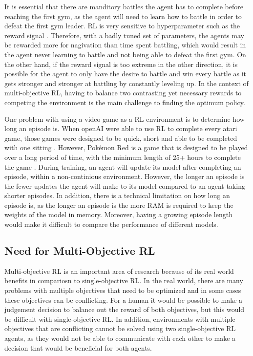 It is essential that there are manditory battles the agent has to complete before reaching the first gym, as the agent will need to learn how to battle in order to defeat the first gym leader. RL is very sensitive to hyperparameter such as the reward signal \cite{XanderSteenbrugge2019ppo}. Therefore, with a badly tuned set of parameters, the agents may be rewarded more for nagivation than time spent battling, which would result in the agent never learning to battle and not being able to defeat the first gym. On the other hand, if the reward signal is too extreme in the other direction, it is possible for the agent to only have the desire to battle and win every battle as it gets stronger and stronger at battling by constantly leveling up. In the context of multi-objective RL, having to balance two contrasting yet necessary rewards to competing the environment is the main challenge to finding the optimum policy. 

One problem with using a video game as a RL environment is to determine how long an episode is. When openAI were able to use RL to complete every atari game, those games were designed to be quick, short and able to be completed with one sitting \cite{brockman2016openai}. However, Pokémon Red is a game that is designed to be played over a long period of time, with the minimum length of 25+ hours to complete the game \cite{howlongtobeat}. During training, an agent will update its model after completing an episode, within a non-continious environment. However, the longer an episode is the fewer updates the agent will make to its model compared to an agent taking shorter episodes. In addition, there is a technical limitation on how long an episode is, as the longer an episode is the more RAM is required to keep the weights of the model in memory. Moreover, having a growing episode length would make it difficult to compare the performance of different models.


\subsection{Need for Multi-Objective RL} 

Multi-objective RL is an important area of research because of its real world benefits in compariosn to single-objective RL. In the real world, there are many problems with multiple objectives that need to be optimized and in some cases these objectives can be conflicting. For a human it would be possible to make a judgement decision to balance out the reward of both objectives, but this would be difficult with single-objective RL. In addition, environments with multiple objectives that are conflicting cannot be solved using two single-objective RL agents, as they would not be able to communicate with each other to make a decision that would be beneficial for both agents. %

